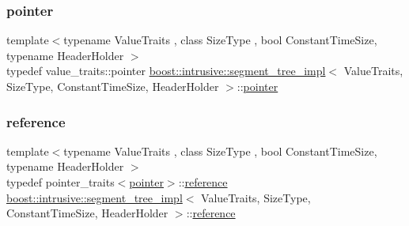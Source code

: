 \mbox{\label{classboost_1_1intrusive_1_1segment__tree__impl_a4345924066a33f309182d027249887ab}} 
\subsubsection{\texorpdfstring{pointer}{pointer}}
{\footnotesize\ttfamily template$<$typename Value\+Traits , class Size\+Type , bool Constant\+Time\+Size, typename Header\+Holder $>$ \\
typedef value\+\_\+traits\+::pointer \hyperlink{classboost_1_1intrusive_1_1segment__tree__impl}{boost\+::intrusive\+::segment\+\_\+tree\+\_\+impl}$<$ Value\+Traits, Size\+Type, Constant\+Time\+Size, Header\+Holder $>$\+::\hyperlink{classboost_1_1intrusive_1_1segment__tree__impl_a4345924066a33f309182d027249887ab}{pointer}}

\mbox{\label{classboost_1_1intrusive_1_1segment__tree__impl_a62cd48d63afd795ad2c6f979266abe94}} 
\subsubsection{\texorpdfstring{reference}{reference}}
{\footnotesize\ttfamily template$<$typename Value\+Traits , class Size\+Type , bool Constant\+Time\+Size, typename Header\+Holder $>$ \\
typedef pointer\+\_\+traits$<$\hyperlink{classboost_1_1intrusive_1_1segment__tree__impl_a4345924066a33f309182d027249887ab}{pointer}$>$\+::\hyperlink{classboost_1_1intrusive_1_1segment__tree__impl_a62cd48d63afd795ad2c6f979266abe94}{reference} \hyperlink{classboost_1_1intrusive_1_1segment__tree__impl}{boost\+::intrusive\+::segment\+\_\+tree\+\_\+impl}$<$ Value\+Traits, Size\+Type, Constant\+Time\+Size, Header\+Holder $>$\+::\hyperlink{classboost_1_1intrusive_1_1segment__tree__impl_a62cd48d63afd795ad2c6f979266abe94}{reference}}

